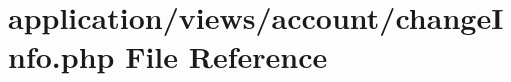 \hypertarget{change_info_8php}{\section{application/views/account/change\-Info.php File Reference}
\label{change_info_8php}
}
